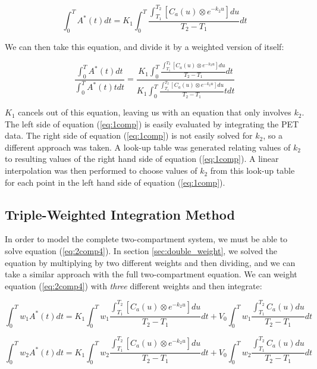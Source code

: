 \documentclass[12pt]{article}
\begin{document}
\begin{equation}
\int_{0}^{T} A^{*}(t) dt = K_{1} \int_{0}^{T} \frac{\int_{T_1}^{T_2}
\left[ C_{a}(u) \otimes e^{-k_{2}u} \right] du}{T_2 - T_1} dt
\end{equation}

We can then take this equation, and divide it by a weighted version
of itself:

\begin{equation}
\frac{\int_{0}^{T} A^{*}(t) dt}{\int_{0}^{T} A^{*}(t) t dt} =
\frac{K_{1} \int_{0}^{T} \frac{\int_{T_1}^{T_2} \left[ C_{a}(u)
\otimes e^{-k_{2}u} \right] du}{T_2 - T_1} dt}{K_{1} \int_{0}^{T}
\frac{\int_{T_1}^{T_2} \left[ C_{a}(u) \otimes e^{-k_{2}u} \right]
du}{T_2 - T_1} t dt}
\label{eq:1comp}
\end{equation}

$K_{1}$ cancels out of this equation, leaving us with an equation
that only involves $k_{2}$.  The left side of equation
(\ref{eq:1comp}) is easily evaluated by integrating the PET data.
The right side of equation (\ref{eq:1comp}) is not easily solved for
$k_{2}$, so a different approach was taken.  A look-up table was
generated relating values of $k_{2}$ to resulting values of the
right hand side of equation (\ref{eq:1comp}).  A linear
interpolation was then performed to choose values of $k_{2}$ from
this look-up table for each point in the left hand side of equation
(\ref{eq:1comp}).


\subsection{Triple-Weighted Integration Method}

In order to model the complete two-compartment system, we must be able
to solve equation (\ref{eq:2comp4}).  In section
\ref{sec:double_weight},
we solved the equation by multiplying by two different weights and
then dividing, and we can take a similar approach with the full
two-compartment equation.  We can weight equation (\ref{eq:2comp4})
with {\em three} different weights and then integrate:

\begin{equation}
\int_{0}^{T} w_{1}A^{*}(t)dt = K_{1} \int_{0}^{T} w_{1}
\frac{\int_{T_1}^{T_2} \left[ C_{a}(u) \otimes e^{-k_{2}u} \right]
du}{T_2 - T_1} dt + V_{0} \int_{0}^{T}w_{1} \frac{\int_{T_1}^{T_2}
C_{a}(u) du}{T_2 - T_1} dt \label{eq:fullweight1}
\end{equation}

\begin{equation}
\int_{0}^{T} w_{2}A^{*}(t)dt = K_{1} \int_{0}^{T} w_{2}
\frac{\int_{T_1}^{T_2} \left[ C_{a}(u) \otimes e^{-k_{2}u} \right]
du}{T_2 - T_1} dt + V_{0} \int_{0}^{T}w_{2} \frac{\int_{T_1}^{T_2}
C_{a}(u) du}{T_2 - T_1} dt \label{eq:fullweight2}
\end{equation}
\end{document}
